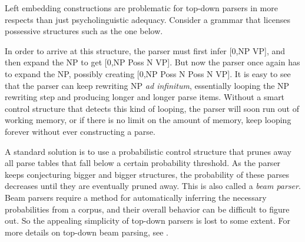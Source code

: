 Left embedding constructions are problematic for top-down parsers in more respects than just psycholinguistic adequacy.
Consider a grammar that licenses possessive structures such as the one below.
%
\begin{center}
\end{center}
%
In order to arrive at this structure, the parser must first infer [0,\psep NP VP], and then expand the NP to get [0,\psep NP Poss N VP].
But now the parser once again has to expand the NP, possibly creating [0,\psep NP Poss N Poss N VP].
It is easy to see that the parser can keep rewriting NP \emph{ad infinitum}, essentially looping the NP rewriting step and producing longer and longer parse items.
Without a smart control structure that detects this kind of looping, the parser will soon run out of working memory, or if there is no limit on the amount of memory, keep looping forever without ever constructing a parse.

A standard solution is to use a probabilistic control structure that prunes away all parse tables that fall below a certain probability threshold.
As the parser keeps conjecturing bigger and bigger structures, the probability of these parses decreases until they are eventually pruned away.
This is also called a \emph{beam parser}.
Beam parsers require a method for automatically inferring the necessary probabilities from a corpus, and their overall behavior can be difficult to figure out.
So the appealing simplicity of top-down parsers is lost to some extent.
For more details on top-down beam parsing, see \citet{Roark01a, Roark01b, Roark04}.

